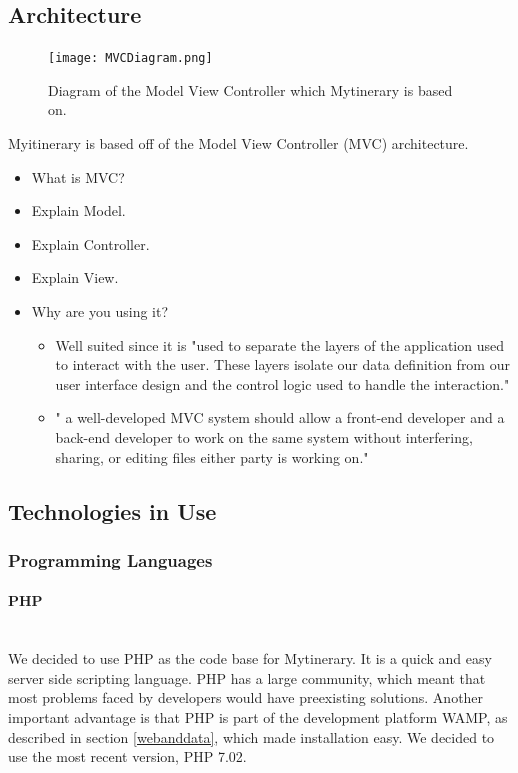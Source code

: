 \documentclass[12pt]{article}
\begin{document}
\subsection{Architecture}

\begin{figure}[ht!]
\centering
\texttt{[image: MVCDiagram.png]}
\caption{Diagram of the Model View Controller which Mytinerary is based on. \label{MVC}}
\end{figure}

Myitinerary is based off of the Model View Controller (MVC) architecture.

\begin{itemize}
    \item What is MVC?
    \item Explain Model.
    \item Explain Controller.
    \item Explain View.
    \item Why are you using it?
    \begin{itemize}
        \item Well suited since it is "used to separate the layers of the application used to interact with the user. These layers isolate our data definition from our user interface design and the control logic used to handle the interaction."
        \item " a well-developed MVC system should allow a front-end developer and a back-end developer to work on the same system without interfering, sharing, or editing files either party is working on."
    \end{itemize}
\end{itemize}
\subsection{Technologies in Use} \label{techInUse}
%
%
\subsubsection{Programming Languages} \label{languages}
\paragraph*{PHP}~\\
We decided to use PHP as the code base for Mytinerary. It is a quick and easy server side scripting language. PHP has a large community, which meant that most problems faced by developers would have preexisting solutions. Another important advantage is that PHP is part of the development platform WAMP, as described in section \ref{webanddata}, which made installation easy. We decided to use the most recent version, PHP 7.02.
%
\end{document}
